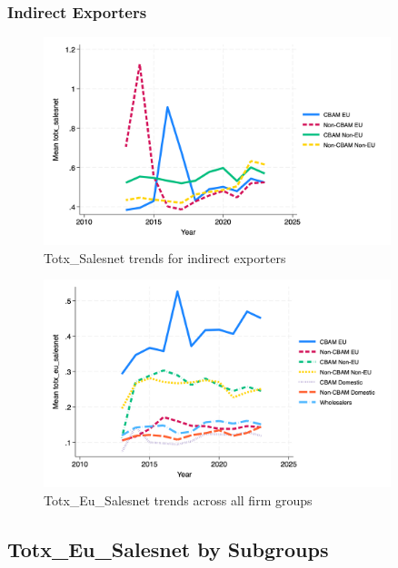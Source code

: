 \documentclass{article}
\begin{document}
\subsubsection{Indirect Exporters}
\begin{figure}[h!]
\centering
\includegraphics[width=0.9\textwidth]{totx_salesnet_indir.png}
\caption{Totx_Salesnet trends for indirect exporters}
\label{fig:totx_salesnet_indir}
\end{figure}

\begin{figure}[h!]
\centering
\includegraphics[width=0.9\textwidth]{totx_eu_salesnet_main_groups.png}
\caption{Totx_Eu_Salesnet trends across all firm groups}
\label{fig:totx_eu_salesnet_main}
\end{figure}

\subsection{Totx_Eu_Salesnet by Subgroups}
\end{document}
